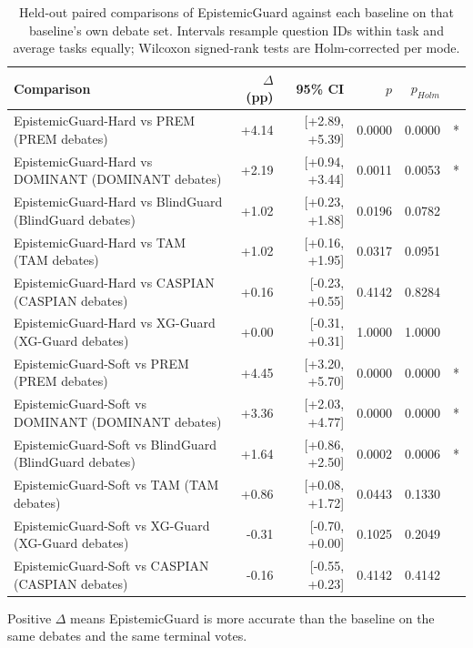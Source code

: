 \begin{table}[htbp]
\centering
\small
\caption{Held-out paired comparisons of EpistemicGuard against each baseline on that baseline's own debate set. Intervals resample question IDs within task and average tasks equally; Wilcoxon signed-rank tests are Holm-corrected per mode.}
\label{tab:stats}
\begin{tabular}{lrrrrl}
\toprule
Comparison & $\Delta$ (pp) & 95\% CI & $p$ & $p_{Holm}$ &  \\
\midrule
EpistemicGuard-Hard vs PREM (PREM debates) & +4.14 & [+2.89, +5.39] & 0.0000 & 0.0000 & * \\
EpistemicGuard-Hard vs DOMINANT (DOMINANT debates) & +2.19 & [+0.94, +3.44] & 0.0011 & 0.0053 & * \\
EpistemicGuard-Hard vs BlindGuard (BlindGuard debates) & +1.02 & [+0.23, +1.88] & 0.0196 & 0.0782 &  \\
EpistemicGuard-Hard vs TAM (TAM debates) & +1.02 & [+0.16, +1.95] & 0.0317 & 0.0951 &  \\
EpistemicGuard-Hard vs CASPIAN (CASPIAN debates) & +0.16 & [-0.23, +0.55] & 0.4142 & 0.8284 &  \\
EpistemicGuard-Hard vs XG-Guard (XG-Guard debates) & +0.00 & [-0.31, +0.31] & 1.0000 & 1.0000 &  \\
EpistemicGuard-Soft vs PREM (PREM debates) & +4.45 & [+3.20, +5.70] & 0.0000 & 0.0000 & * \\
EpistemicGuard-Soft vs DOMINANT (DOMINANT debates) & +3.36 & [+2.03, +4.77] & 0.0000 & 0.0000 & * \\
EpistemicGuard-Soft vs BlindGuard (BlindGuard debates) & +1.64 & [+0.86, +2.50] & 0.0002 & 0.0006 & * \\
EpistemicGuard-Soft vs TAM (TAM debates) & +0.86 & [+0.08, +1.72] & 0.0443 & 0.1330 &  \\
EpistemicGuard-Soft vs XG-Guard (XG-Guard debates) & -0.31 & [-0.70, +0.00] & 0.1025 & 0.2049 &  \\
EpistemicGuard-Soft vs CASPIAN (CASPIAN debates) & -0.16 & [-0.55, +0.23] & 0.4142 & 0.4142 &  \\
\bottomrule
\end{tabular}
\par\smallskip\footnotesize Positive $\Delta$ means EpistemicGuard is more accurate than the baseline on the same debates and the same terminal votes.
\end{table}

